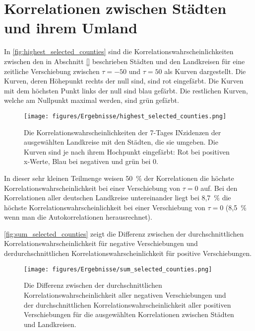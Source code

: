 \section{Korrelationen zwischen Städten und ihrem Umland}
In \autoref{fig:highest_selected_counties} sind die Korrelationswahrscheinlichkeiten zwischen den in Abschnitt \autoref{} beschrieben Städten und den Landkreisen für eine zeitliche Verschiebung zwischen $\tau=-50$ und $\tau=50$ als Kurven dargestellt.
Die Kurven, deren Höhepunkt rechts der null sind, sind rot eingefärbt. Die Kurven mit dem höchsten Punkt links der null sind blau gefärbt. Die restlichen Kurven, welche am Nullpunkt maximal werden, sind grün gefärbt.
\begin{figure}[H]
    \centering
    \texttt{[image: figures/Ergebnisse/highest\_selected\_counties.png]}
    \caption{Die Korrelationswahrscheinlichkeiten der 7-Tages INzidenzen der ausgewählten Landkreise mit den Städten, die sie umgeben. Die Kurven sind je nach ihrem Hochpunkt eingefärbt: Rot bei positiven x-Werte, Blau bei negativen und grün bei 0.}
    \label{fig:highest_selected_counties}
\end{figure}

In dieser sehr kleinen Teilmenge weisen 50~\% der Korrelationen die höchste Korrelationswahrscheinlichkeit bei einer Verschiebung von $\tau = 0$ auf.
Bei den Korrelationen aller deutschen Landkreise untereinander liegt bei 8,7~\% die höchste Korrelationswahrscheinlichkeit bei einer Verschiebung von $\tau= 0$ (8,5~\% wenn man die Autokorrelationen herausrechnet).

\autoref{fig:sum_selected_counties} zeigt die Differenz zwischen der durchschnittlichen Korrelationswahrscheinlichkeit für negative Verschiebungen und derdurchschnittlichen Korrelationswahrscheinlichkeit für positive Verschiebungen.
\begin{figure}
    \centering
    \texttt{[image: figures/Ergebnisse/sum\_selected\_counties.png]}
    \caption{Die Differenz zwischen der durchschnittlichen Korrelationswahrscheinlichkeit aller negativen Verschiebungen und der durchschnittlichen Korrelationswahrscheinlichkeit aller positiven Verschiebungen für die ausgewählten Korrelationen zwischen Städten und Landkreisen.}
    \label{fig:sum_selected_counties}
\end{figure}